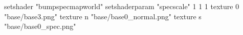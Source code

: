 setshader "bumpspecmapworld"
setshaderparam "specscale" 1 1 1
    texture 0 "base/base3.png"
    texture n "base/base0_normal.png"
    texture s "base/base0_spec.png"